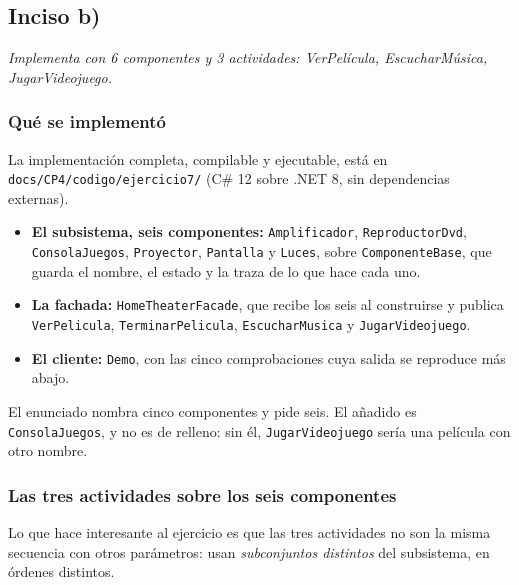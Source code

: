 {}
\subsection*{Inciso b)}

\sloppy

\textit{Implementa con 6 componentes y 3 actividades: VerPelícula, EscucharMúsica,
JugarVideojuego.}

\vspace{0.4cm}

\subsubsection*{Qué se implementó}

La implementación completa, compilable y ejecutable, está en
\texttt{docs/CP4/codigo/ejercicio7/} (C\# 12 sobre .NET 8, sin dependencias externas).

\begin{itemize}[leftmargin=1.2cm]
    \item \textbf{El subsistema, seis componentes:} \texttt{Amplificador},
          \texttt{ReproductorDvd}, \texttt{ConsolaJuegos}, \texttt{Proyector},
          \texttt{Pantalla} y \texttt{Luces}, sobre \texttt{ComponenteBase}, que guarda el
          nombre, el estado y la traza de lo que hace cada uno.
    \item \textbf{La fachada:} \texttt{HomeTheaterFacade}, que recibe los seis al
          construirse y publica \texttt{VerPelicula}, \texttt{TerminarPelicula},
          \texttt{EscucharMusica} y \texttt{JugarVideojuego}.
    \item \textbf{El cliente:} \texttt{Demo}, con las cinco comprobaciones cuya salida se
          reproduce más abajo.
\end{itemize}

El enunciado nombra cinco componentes y pide seis. El añadido es \texttt{ConsolaJuegos}, y no
es de relleno: sin él, \texttt{JugarVideojuego} sería una película con otro nombre.

\subsubsection*{Las tres actividades sobre los seis componentes}

Lo que hace interesante al ejercicio es que las tres actividades no son la misma secuencia con
otros parámetros: usan \emph{subconjuntos distintos} del subsistema, en órdenes distintos.

